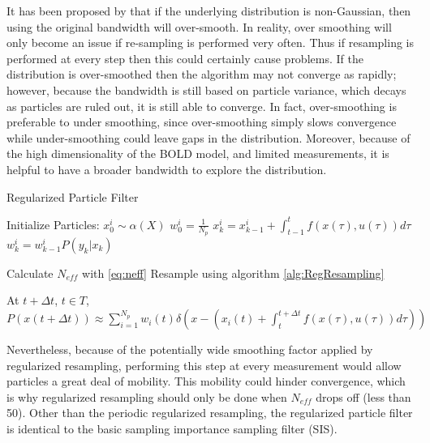 It has been proposed by \cite{Hurzeler1998} that if the underlying 
distribution is non-Gaussian, then using the original bandwidth will over-smooth. 
In reality, over smoothing
will only become an issue if re-sampling is performed very often. Thus
if resampling is performed at every step then this could certainly cause problems.
If the distribution is over-smoothed then the algorithm may not converge as rapidly;
however, because the bandwidth is still based on particle variance, which decays as 
particles are ruled out, it is still able to converge. In fact, over-smoothing is preferable
to under smoothing, since over-smoothing simply slows convergence while 
under-smoothing could leave gaps in the distribution.
Moreover, because of the high dimensionality of the BOLD model,
and limited measurements, it is helpful to have a broader bandwidth to explore the distribution. 

\begin{algorithm}
\caption{Regularized Particle Filter}
\begin{algorithmic}
\STATE Initialize Particles:
    \STATE $x^i_0  \sim \alpha(X)$
    \STATE $w^i_0 = \frac{1}{N_p}$
\ENDFOR
{}
        \STATE $x^i_k = x^i_{k-1} + \int_{t-1}^t f(x(\tau), u(\tau)) d\tau $
        \STATE $w^i_k = w^i_{k-1}P(y_k | x_k)$
    \ENDFOR

    \STATE Calculate $N_{eff}$ with \autoref{eq:neff}
        \STATE Resample using algorithm \autoref{alg:RegResampling}
    \ENDIF
\ENDFOR

\STATE At $t + \Delta t$, $t \in T$, $P(x(t+\Delta t)) \approx 
\sum_{i=1}^{N_p} w_i(t)\delta\left(x - (x_i(t) + \int_t^{t+\Delta t} f(x(\tau), u(\tau)) d\tau) \right)$
 \end{algorithmic}
 \end{algorithm}

Nevertheless, because 
of the potentially wide smoothing factor applied by regularized resampling, performing this
step at every measurement would allow particles a great deal of mobility. This mobility could
hinder convergence, which is why regularized resampling should only be done when
$N_{eff}$ drops off (less than 50). Other than the periodic regularized
resampling, the regularized particle filter is identical to the basic sampling
importance sampling filter (SIS). 

